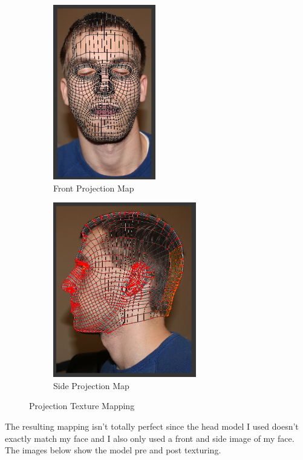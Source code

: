 \documentclass{article}
\begin{document}
\begin{figure}[H]
    \centering
    \begin{subfigure}{.5\textwidth}
        \centering
        \includegraphics[height=3in]{map_front.png}
        \caption{Front Projection Map}
    \end{subfigure}%
    \begin{subfigure}{.5\textwidth}
        \centering
        \includegraphics[height=3in]{map_side.png}
        \caption{Side Projection Map}
    \end{subfigure}
    \caption{Projection Texture Mapping}
\end{figure}

The resulting mapping isn't totally perfect since the head
model I used doesn't exactly match my face and I also only
used a front and side image of my face. The images below
show the model pre and post texturing.
\end{document}

